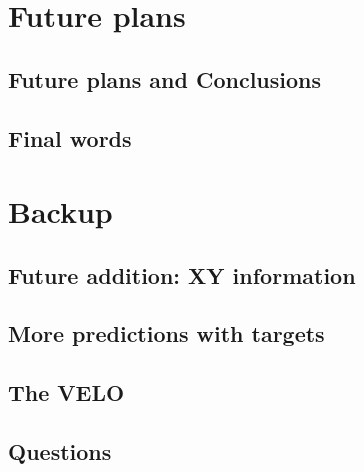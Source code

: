 \documentclass[aspectratio=169, 10pt]{beamer}
\begin{document}

\section{Future plans}

\subsection{Future plans and Conclusions}


\subsection{Final words}




\backupbegin

\section{Backup}

\subsection{Future addition: XY information}


\subsection{More predictions with targets}


\subsection{The VELO}


\subsection{Questions}




\backupend
\end{document}
